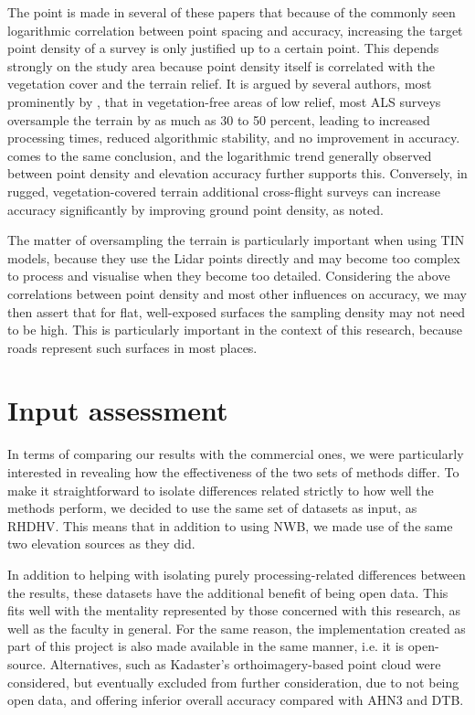 The point is made in several of these papers that because of the commonly seen logarithmic correlation between point spacing and accuracy, increasing the target point density of a survey is only justified up to a certain point. This depends strongly on the study area because point density itself is correlated with the vegetation cover and the terrain relief. It is argued by several authors, most prominently by \cite{guo_etal_2010}, that in vegetation-free areas of low relief, most ALS surveys oversample the terrain by as much as 30 to 50 percent, leading to increased processing times, reduced algorithmic stability, and no improvement in accuracy. \cite{bater_coops_2009} comes to the same conclusion, and the logarithmic trend generally observed between point density and elevation accuracy further supports this. Conversely, in rugged, vegetation-covered terrain additional cross-flight surveys can increase accuracy significantly by improving ground point density, as \cite{peng_shih_2006} noted.

The matter of oversampling the terrain is particularly important when using TIN models, because they use the Lidar points directly and may become too complex to process and visualise when they become too detailed. Considering the above correlations between point density and most other influences on accuracy, we may then assert that for flat, well-exposed surfaces the sampling density may not need to be high. This is particularly important in the context of this research, because roads represent such surfaces in most places.

\section{Input assessment}
\label{sec:input}

In terms of comparing our results with the commercial ones, we were particularly interested in revealing how the effectiveness of the two sets of methods differ. To make it straightforward to isolate differences related strictly to how well the methods perform, we decided to use the same set of datasets as input, as RHDHV. This means that in addition to using NWB, we made use of the same two elevation sources as they did.

In addition to helping with isolating purely processing-related differences between the results, these datasets have the additional benefit of being open data. This fits well with the mentality represented by those concerned with this research, as well as the faculty in general. For the same reason, the implementation created as part of this project is also made available in the same manner, i.e. it is open-source. Alternatives, such as Kadaster's orthoimagery-based point cloud were considered, but eventually excluded from further consideration, due to not being open data, and offering inferior overall accuracy compared with AHN3 and DTB.

